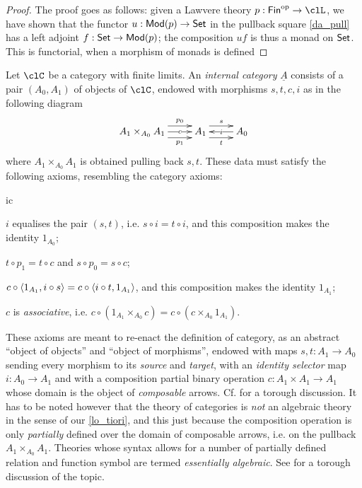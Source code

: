 \begin{proof}
	The proof goes as follows: given a Lawvere theory $p : \textsf{Fin}^\op \to \clL$, we have shown that the functor $u : \mathsf{Mod}(p) \to \mathsf{Set}$ in the pullback square \autoref{da_pull} has a left adjoint $f : \mathsf{Set} \to \mathsf{Mod}(p)$; the composition $uf$ is thus a monad on $\mathsf{Set}$. This is functorial, when a morphism of monads is defined
\end{proof}
\begin{definition}
	\label{internista}
	Let  $\clC$ be a category with finite limits. An \emph{internal category} $\underline{A}$ consists of a pair $(A_0, A_1)$ of objects of $\clC$, endowed with morphisms $s,t,c,i$ as in the following diagram
	\[
		\xymatrix{
		A_1 \times_{A_0} A_1 \ar[r]|-c \ar@<6pt>[r]^-{p_0}  \ar@<-6pt>[r]_-{p_1} & A_1 \ar@<6pt>[r]^s  \ar@<-6pt>[r]_t & A_0 \ar[l]|i
		}
	\]
	where $A_1 \times_{A_0} A_1$ is obtained pulling back $s,t$. These data must satisfy the following axioms, resembling the category axioms:
	\begin{enumtag}{ic}
		\item $i$ equalises the pair $(s,t)$, i.e. $s\circ i= t\circ i$, and this composition makes the identity $1_{A_0}$;
		\item $t\circ p_1 = t\circ c$ and $s\circ p_0 = s \circ c$;
		\item $c\circ\langle 1_{A_1},i\circ s\rangle = c\circ\langle i\circ t, 1_{A_1}\rangle$, and this composition makes the identity $1_{A_1}$;
		\item $c$ is \emph{associative}, i.e. $c \circ (1_{A_1}\times_{A_0} c)= c \circ (c \times_{A_0} 1_{A_1})$.
	\end{enumtag}
\end{definition}
These axioms are meant to re-enact the definition of category, as an abstract ``object of objects'' and ``object of morphisms'', endowed with maps $s,t: A_1 \to A_0$ sending every morphism to its \emph{source} and \emph{target}, with an \emph{identity selector} map $i : A_0 \to A_1$ and with a composition partial binary operation $c : A_1 \times A_1 \to A_1$ whose domain is the object of \emph{composable} arrows. Cf. \cite[8]{Bor1} for a torough discussion.
It has to be noted however that the theory of categories is \emph{not} an algebraic theory in the sense of our \autoref{lo_tiori}, and this just because the composition operation is only \emph{partially} defined over the domain of composable arrows, i.e. on the pullback $A_1\times_{A_0} A_1$. Theories whose syntax allows for a number of partially defined relation and function symbol are termed \emph{essentially algebraic}. See \cite{Adamek1994} for a torough discussion of the topic.